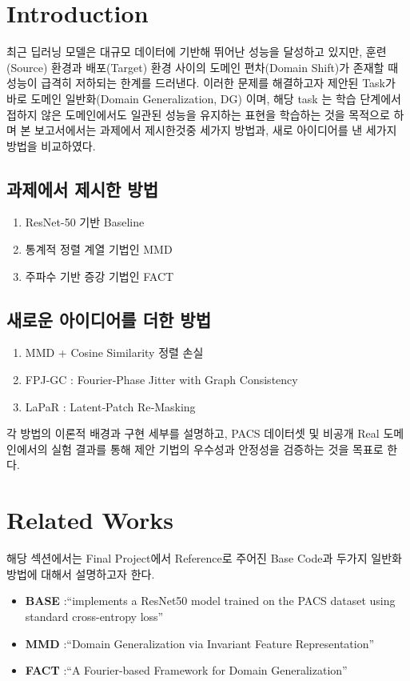 \section{Introduction}
\label{sec:intro}

최근 딥러닝 모델은 대규모 데이터에 기반해 뛰어난 성능을 달성하고 있지만, 
훈련(Source) 환경과 배포(Target) 환경 사이의 도메인 편차(Domain Shift)가 존재할 때 
성능이 급격히 저하되는 한계를 드러낸다. 이러한 문제를 해결하고자 제안된 Task가 바로 
도메인 일반화(Domain Generalization, DG) 이며, 해당 task 는 학습 단계에서 접하지 
않은 도메인에서도 일관된 성능을 유지하는 표현을 학습하는 것을 목적으로 하며 본 
보고서에서는 과제에서 제시한것중 세가지 방법과, 새로 아이디어를 낸 세가지 방법을 
비교하였다.

\subsection{과제에서 제시한 방법}
\begin{enumerate}[leftmargin=2em]
  \item ResNet-50 기반 Baseline
  \item 통계적 정렬 계열 기법인 MMD
  \item 주파수 기반 증강 기법인 FACT
\end{enumerate}

\subsection{새로운 아이디어를 더한 방법}
\begin{enumerate}[leftmargin=2em]
  \item MMD + Cosine Similarity 정렬 손실
  \item FPJ-GC : Fourier‑Phase Jitter with Graph Consistency
  \item LaPaR : Latent‑Patch Re‑Masking
\end{enumerate}

각 방법의 이론적 배경과 구현 세부를 설명하고, PACS 데이터셋 및 비공개 Real 도메인에서의 
실험 결과를 통해 제안 기법의 우수성과 안정성을 검증하는 것을 목표로 한다.

\section{Related Works}
해당 섹션에서는 Final Project에서 Reference로 주어진 Base Code과 두가지 일반화 방법에 대해서 설명하고자 한다.
\vspace{1em}
\begin{itemize}[leftmargin=2em]
  \item \textbf{BASE} \cite{he2016residual}:{“implements a ResNet50 model trained on the PACS dataset using standard cross-entropy loss”}
  \item \textbf{MMD} \cite{muandet2013invariant}:{“Domain Generalization via Invariant Feature Representation”}
  \item \textbf{FACT} \cite{xu2021fact}:{“A Fourier-based Framework for Domain Generalization”}
\end{itemize}

